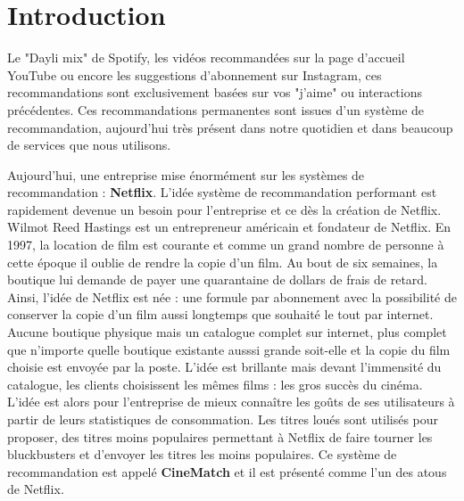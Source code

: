 \chapter*{Introduction}
\label{chap:introduction}




\vspace{5mm}

Le "Dayli mix" de Spotify, les vidéos recommandées sur la page d’accueil YouTube ou encore les suggestions d’abonnement sur Instagram, ces recommandations sont exclusivement basées sur vos "j'aime" ou interactions précédentes. Ces recommandations permanentes sont issues d’un système de recommandation, aujourd’hui très présent dans notre quotidien et dans beaucoup de services que nous utilisons.

\vspace{5mm}

Aujourd’hui, une entreprise mise énormément sur les systèmes de recommandation : \textbf{Netflix}. L'idée système de recommandation performant est rapidement devenue un besoin pour l'entreprise et ce dès la création de Netflix. Wilmot Reed Hastings est un entrepreneur américain et fondateur de Netflix. En 1997, la location de film est courante et comme un grand nombre de personne à cette époque il oublie de rendre la copie d'un film. Au bout de six semaines, la boutique lui demande de payer une quarantaine de dollars de frais de retard\supercite{NetflixOrigins}. Ainsi, l'idée de Netflix est née :  une formule par abonnement avec la possibilité de conserver la copie d'un film aussi longtemps que souhaité le tout par internet. Aucune boutique physique mais un catalogue complet sur internet, plus complet que n'importe quelle boutique existante ausssi grande soit-elle et la copie du film choisie est envoyée par la poste. L'idée est brillante mais devant l'immensité du catalogue, les clients choisissent les mêmes films : les gros succès du cinéma. L'idée est alors pour l'entreprise de mieux  connaître les goûts de ses utilisateurs à partir de leurs statistiques de consommation. Les titres loués sont utilisés pour proposer, des titres moins populaires permettant à Netflix de faire tourner les bluckbusters et d'envoyer les titres les moins populaires. Ce système de recommandation est appelé  \textbf{CineMatch} et il est présenté comme l’un des atous de Netflix. 

\vspace{5mm}


